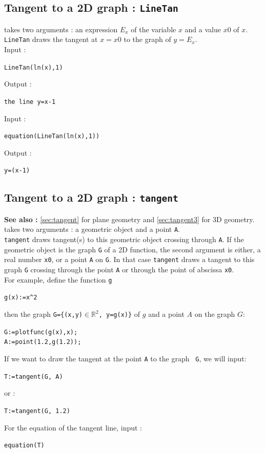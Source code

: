 \documentclass[a4paper,11pt]{book}
\newcommand{\R}{{\mathbb{R}}}
\begin{document}
\subsection{Tangent to a 2D graph : {\tt LineTan}}
 takes two arguments : an expression $E_x$ of the
variable $x$ and a value $x0$ of $x$.\\
 {\tt LineTan} draws the tangent at $x=x0$ to the graph of $y=E_x$.\\
Input :
\begin{center}{\tt LineTan(ln(x),1)}\end{center}
Output :
\begin{center}{\tt the line y=x-1}\end{center}
Input :
\begin{center}{\tt equation(LineTan(ln(x),1))}\end{center}
Output :
\begin{center}{\tt y=(x-1)}\end{center}

\subsection{Tangent to a 2D graph : {\tt tangent}}\label{sec:tangente}
{\bf See also :} \ref{sec:tangent} for plane geometry and 
\ref{sec:tangent3} for 3D geometry.\\
 takes two arguments : a geometric object and a point 
{\tt A}.\\
{\tt tangent} draws tangent(s) to this geometric object crossing through 
{\tt A}. If the geometric object is the graph {\tt G} of a 2D function, 
the second argument is either, a real number {\tt x0}, or a 
point {\tt A} on {\tt G}. In that case {\tt tangent} draws a tangent to this
graph {\tt G} crossing through the point {\tt A} or through the 
point of abscissa {\tt x0}.\\
For example, define the function {\tt g}
\begin{center} \verb|g(x):=x^2|\end{center}
then the graph {\tt G=\{(x,y)$\in \R^2$, y=g(x)\}}
of $g$ and a point $A$ on the graph $G$:
\begin{center}
{\tt G:=plotfunc(g(x),x);}\\
{\tt A:=point(1.2,g(1.2));}
\end{center}
If we want to draw the tangent at the point {\tt A} to the graph {\tt
  G}, we will input:
\begin{center}
{\tt T:=tangent(G, A)}
\end{center}
or :
\begin{center}
{\tt T:=tangent(G, 1.2)}
\end{center}
For the equation of the tangent line, input :
\begin{center}{\tt equation(T)}\end{center}
\end{document}
